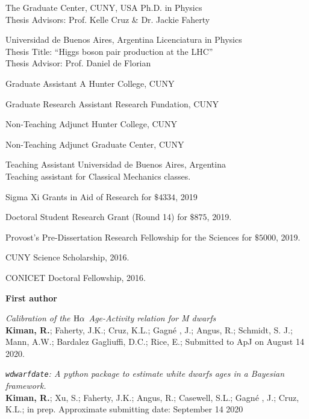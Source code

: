 \documentclass[10pt]{cv}
\begin{document}
\begin{llist}

The Graduate Center, CUNY, USA
Ph.D. in Physics\\
Thesis Advisors: Prof. Kelle Cruz \& Dr. Jackie Faherty

Universidad de Buenos Aires, Argentina
Licenciatura in Physics\\
Thesis Title: ``Higgs boson pair production at the LHC''\\
Thesis Advisor: Prof. Daniel de Florian


Graduate Assistant A
Hunter College, CUNY

Graduate Research Assistant
Research Fundation, CUNY

Non-Teaching Adjunct
Hunter College, CUNY

Non-Teaching Adjunct
Graduate Center, CUNY

Teaching Assistant
Universidad de Buenos Aires, Argentina\\
Teaching assistant for Classical Mechanics classes.


Sigma Xi Grants in Aid of Research for $\$4334$, 2019

Doctoral Student Research Grant (Round 14) for $\$875$, 2019.

Provost’s Pre-Dissertation Research Fellowship for the Sciences for $\$5000$, 2019.

CUNY Science Scholarship, 2016.

CONICET Doctoral Fellowship, 2016.



\textbf{First author}

\textit{Calibration of the ${\rm H}\alpha$ Age-Activity relation for M dwarfs}\\
\textbf{Kiman, R.}; Faherty, J.K.; Cruz, K.L.; Gagn\'e , J.; Angus, R.; Schmidt, S. J.; Mann, A.W.; Bardalez Gagliuffi, D.C.; Rice, E.; Submitted to ApJ on August 14 2020. 

\textit{\texttt{wdwarfdate}: A python package to estimate white dwarfs ages in a Bayesian framework.}\\
\textbf{Kiman, R.}; Xu, S.; Faherty, J.K.; Angus, R.; Casewell, S.L.; Gagn\'e , J.; Cruz, K.L.; in prep. Approximate submitting date: September 14 2020


\end{llist}
\end{document}
